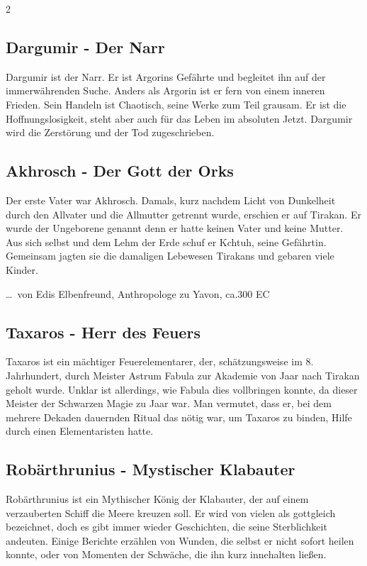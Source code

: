 \begin{multicols*}{2}
\subsection{Dargumir - Der Narr}\label{subsec:dargumir-der-narr}

Dargumir ist der Narr.
Er ist Argorins Gefährte und begleitet ihn auf der immerwährenden Suche.
Anders als Argorin ist er fern von einem inneren Frieden.
Sein Handeln ist Chaotisch, seine Werke zum Teil grausam.
Er ist die Hoffnungslosigkeit, steht aber auch für das Leben im absoluten Jetzt.
Dargumir wird die Zerstörung und der Tod zugeschrieben.

\subsection{Akhrosch - Der Gott der Orks}\label{subsec:akhrosch-der-gott-der-orks}

Der erste Vater war Akhrosch.
Damals, kurz nachdem Licht von Dunkelheit durch den Allvater und die Allmutter getrennt wurde, erschien er auf Tirakan.
Er wurde der Ungeborene genannt denn er hatte keinen Vater und keine Mutter.
Aus sich selbst und dem Lehm der Erde schuf er Kchtuh, seine Gefährtin.
Gemeinsam jagten sie die damaligen Lebewesen Tirakans und gebaren viele Kinder.

… von Edis Elbenfreund, Anthropologe zu Yavon, ca.300 EC

\subsection{Taxaros - Herr des Feuers}\label{subsec:taxaros-herr-des-feuers}

 Taxaros ist ein mächtiger Feuerelementarer, der, schätzungsweise im 8. Jahrhundert, durch Meister Astrum Fabula zur Akademie von Jaar nach Tirakan geholt wurde.
 Unklar ist allerdings, wie Fabula dies vollbringen konnte, da dieser Meister der Schwarzen Magie zu Jaar war.
 Man vermutet, dass er, bei dem mehrere Dekaden dauernden Ritual das nötig war, um Taxaros zu binden, Hilfe durch einen Elementaristen hatte.

\subsection{Robärthrunius - Mystischer Klabauter}\label{subsec:robarthrunius-mystischer-klabauter}

Robärthrunius ist ein Mythischer König der Klabauter, der auf einem verzauberten Schiff die Meere kreuzen soll.
Er wird von vielen als gottgleich bezeichnet, doch es gibt immer wieder Geschichten, die seine Sterblichkeit andeuten.
Einige Berichte erzählen von Wunden, die selbst er nicht sofort heilen konnte, oder von Momenten der Schwäche, die ihn kurz innehalten ließen.


\end{multicols*}
